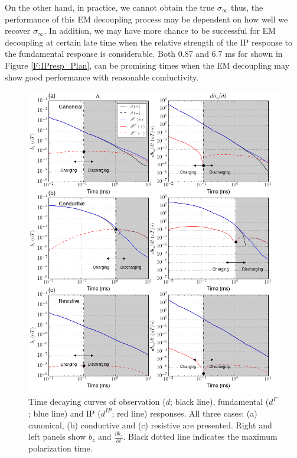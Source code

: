 \documentclass[a4paper, 11pt]{article}
\newcommand{\siginf}{\sigma_\infty}
\newcommand{\dip}{d^{IP}}
\begin{document}
On the other hand, in practice, we cannot obtain the true $\siginf$ thus, the performance of this EM decoupling process may be dependent on how well we recover $\siginf$.
In addition, we may have more chance to be successful for EM decoupling at certain late time when the relative strength of the IP response to the fundamental response is considerable.  
Both 0.87 and 6.7 ms for shown in Figure \ref{F:IPresp_Plan}, can be promising times when the EM decoupling may show good performance with reasonable conductivity. 
\begin{figure}[htb]
  \centering
  \includegraphics[width=1.\textwidth]{figures/Three_IPresp.png}
  \caption{Time decaying curves of observation ($d$; black line), fundamental ($d^F$; blue line) and IP ($\dip$; red line) responses. All three cases: (a) canonical, (b) conductive and (c) resistive are presented. Right and left panels show $b_z$ and $\frac{\partial b_z}{\partial t}$. Black dotted line indicates the maximum polarization time.}
  \label{F:Three_IPresp}
\end{figure}
\end{document}
